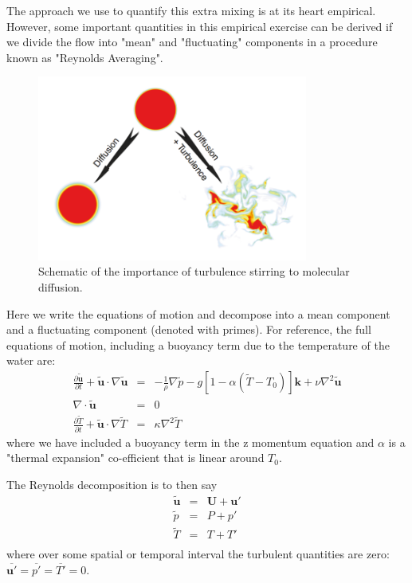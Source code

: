 \documentclass[11pt]{article}
\begin{document}
The approach we use to quantify this extra mixing is at its heart empirical.  However, some important quantities in this empirical exercise can be derived if we divide the flow into "mean" and "fluctuating" components in a procedure known as "Reynolds Averaging".  

\begin{figure}[hbtp]
  \begin{center}
    \includegraphics[width=3.5in]{images/SmythMoum01Schematic}
    \caption{Schematic of the importance of turbulence stirring to molecular diffusion. }   
    \label{fig:SmythMoum01Schematic}
  \end{center}
\end{figure}

Here we write the equations of motion and decompose into a mean component and a fluctuating component (denoted with primes).  For reference, the full equations of motion, including a buoyancy term due to the temperature of the water are:
 \begin{eqnarray*}
     \frac{\partial \mathbf{\tilde{u}}}{\partial t} + \mathbf{\tilde{u}}\cdot \nabla \mathbf{\tilde{u}} & = & -\frac{1}{\rho} \nabla \tilde{p} - g \left[  1 - \alpha(\tilde{T}-T_0)\right]\mathbf{k} + \nu \nabla^2 \mathbf{\tilde{u}}\\
     \nabla\cdot\mathbf{\tilde{u}} & = & 0\\
     \frac{\partial \tilde{T}}{\partial t} + \mathbf{\tilde{u}}\cdot\nabla \tilde{T} & = & \kappa \nabla^2 \tilde{T}
 \end{eqnarray*}
where we have included a buoyancy term in the z momentum equation and $\alpha$ is a "thermal expansion" co-efficient that is linear around $T_0$.  

The Reynolds decomposition is to then say
\begin{eqnarray*}
    \mathbf{\tilde{u}} & = & \mathbf{U} + \mathbf{u'}\\
    \tilde{p} & = & P + p'\\
    \tilde{T} & = & T + T'\\
\end{eqnarray*}
where over some spatial or temporal interval the turbulent quantities are zero: $\overline{\mathbf{u'}} = \overline{p'} = \overline{T'} = 0$.  
\end{document}

